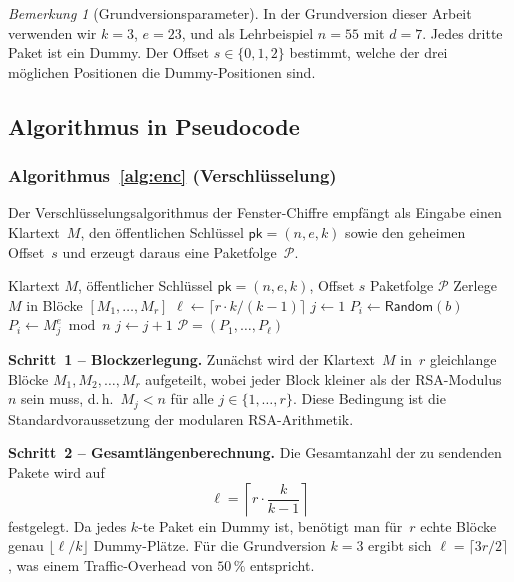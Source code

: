 ﻿\documentclass[12pt, a4paper]{article}
\theoremstyle{plain}
\theoremstyle{definition}
\theoremstyle{remark}
\newtheorem{remark}[theorem]{Bemerkung}
\newcommand{\pk}{\mathsf{pk}}
\begin{document}
\begin{remark}[Grundversionsparameter]\label{rem:grundversion}
  In der Grundversion dieser Arbeit verwenden wir $k=3$, $e=23$, und als
  Lehrbeispiel $n=55$ mit $d=7$. Jedes dritte Paket ist ein Dummy.
  Der Offset $s \in \{0,1,2\}$ bestimmt, welche der drei m\"oglichen
  Positionen die Dummy-Positionen sind.
\end{remark}

\subsection{Algorithmus in Pseudocode}

\subsubsection{Algorithmus~\ref{alg:enc} (Verschl\"usselung)}

Der Verschl\"usselungsalgorithmus der Fenster-Chiffre empf\"angt als Eingabe
einen Klartext~$M$, den \"offentlichen Schl\"ussel $\pk = (n, e, k)$ sowie
den geheimen Offset~$s$ und erzeugt daraus eine Paketfolge~$\mathcal{P}$.

\begin{algorithm}[h]
\caption{Fenster-Chiffre: Verschl\"usselung}
\label{alg:enc}
\begin{algorithmic}[1]
\Require Klartext $M$, \"offentlicher Schl\"ussel $\pk=(n,e,k)$, Offset $s$
\Ensure Paketfolge $\mathcal{P}$
\State Zerlege $M$ in Bl\"ocke $[M_1,\ldots,M_r]$
\State $\ell \gets \lceil r \cdot k/(k-1) \rceil$
\State $j \gets 1$ 
    \State $P_i \gets \mathsf{Random}(b)$ 
  \Else
    \State $P_i \gets M_j^e \bmod n$
    \State $j \gets j + 1$
  \EndIf
\EndFor
\State \Return $\mathcal{P} = (P_1,\ldots,P_\ell)$
\end{algorithmic}
\end{algorithm}

\medskip
\noindent\textbf{Schritt~1 -- Blockzerlegung.}
Zun\"achst wird der Klartext~$M$ in~$r$ gleichlange Bl\"ocke
$M_1, M_2, \ldots, M_r$ aufgeteilt, wobei jeder Block kleiner als der
RSA-Modulus~$n$ sein muss, d.\,h.\ $M_j < n$ f\"ur alle $j \in \{1,\ldots,r\}$.
Diese Bedingung ist die Standard\-voraussetzung der modularen RSA-Arithmetik.

\medskip
\noindent\textbf{Schritt~2 -- Gesamtl\"angenberechnung.}
Die Gesamtanzahl der zu sendenden Pakete wird auf
\[
  \ell = \left\lceil r \cdot \frac{k}{k-1} \right\rceil
\]
festgelegt. Da jedes $k$-te Paket ein Dummy ist, ben\"otigt man f\"ur~$r$
echte Bl\"ocke genau $\lfloor \ell / k \rfloor$ Dummy-Pl\"atze. F\"ur die
Grundversion $k = 3$ ergibt sich $\ell = \lceil 3r/2 \rceil$, was einem
Traffic-Overhead von $50\,\%$ entspricht.
\end{document}
